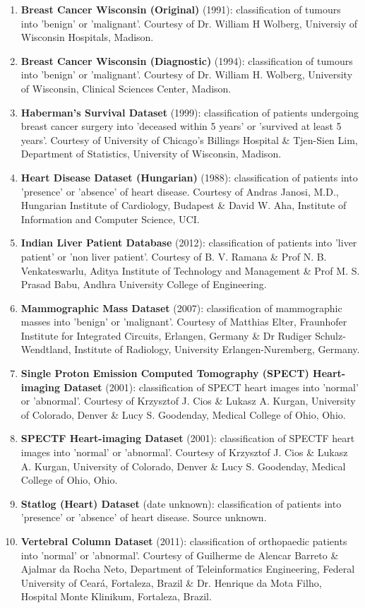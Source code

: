 \documentclass{bioinfo}
\begin{document}
\begin{methods}
\begin{enumerate}
    \item \textbf{Breast Cancer Wisconsin (Original)} (1991): classification of tumours into 'benign' or 'malignant'. Courtesy of Dr. William H Wolberg, Universiy of Wisconsin Hospitals, Madison.
    \item \textbf{Breast Cancer Wisconsin (Diagnostic)} (1994): classification of tumours into 'benign' or 'malignant'. Courtesy of Dr. William H. Wolberg, University of Wisconsin, Clinical Sciences Center, Madison.
    \item \textbf{Haberman's Survival Dataset} (1999): classification of patients undergoing breast cancer surgery into 'deceased within 5 years' or 'survived at least 5 years'. Courtesy of University of Chicago's Billings Hospital \& Tjen-Sien Lim, Department of Statistics, University of Wisconsin, Madison.
    \item \textbf{Heart Disease Dataset (Hungarian)} (1988): classification of patients into 'presence' or 'absence' of heart disease. Courtesy of Andras Janosi, M.D., Hungarian Institute of Cardiology, Budapest \& David W. Aha, Institute of Information and Computer Science, UCI.
    \item \textbf{Indian Liver Patient Database} (2012): classification of patients into 'liver patient' or 'non liver patient'. Courtesy of B. V. Ramana \& Prof N. B. Venkateswarlu, Aditya Institute of Technology and Management \& Prof M. S. Prasad Babu, Andhra University College of Engineering.
    \item \textbf{Mammographic Mass Dataset} (2007): classification of mammographic masses into 'benign' or 'malignant'. Courtesy of Matthias Elter, Fraunhofer Institute for Integrated Circuits, Erlangen, Germany \& Dr Rudiger Schulz-Wendtland, Institute of Radiology, University Erlangen-Nuremberg, Germany.
    \item \textbf{Single Proton Emission Computed Tomography (SPECT) Heart-imaging Dataset} (2001): classification of SPECT heart images into 'normal' or 'abnormal'. Courtesy of Krzysztof J. Cios \& Lukasz A. Kurgan, University of Colorado, Denver \& Lucy S. Goodenday, Medical College of Ohio, Ohio.
    \item \textbf{SPECTF Heart-imaging Dataset} (2001): classification of SPECTF heart images into 'normal' or 'abnormal'. Courtesy of Krzysztof J. Cios \& Lukasz A. Kurgan, University of Colorado, Denver \& Lucy S. Goodenday, Medical College of Ohio, Ohio.
    \item \textbf{Statlog (Heart) Dataset} (date unknown): classification of patients into 'presence' or 'absence' of heart disease. Source unknown.
    \item \textbf{Vertebral Column Dataset} (2011): classification of orthopaedic patients into 'normal' or 'abnormal'. Courtesy of Guilherme de Alencar Barreto \& Ajalmar da Rocha Neto, Department of Teleinformatics Engineering, Federal University of Ceará, Fortaleza, Brazil \& Dr. Henrique da Mota Filho, Hospital Monte Klinikum, Fortaleza, Brazil.
\end{enumerate}


\end{methods}
\end{document}
